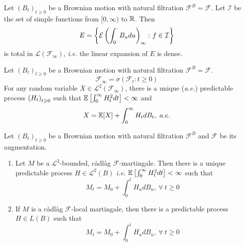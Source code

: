 \documentclass[a4paper,12pt]{article}
\begin{document}
\begin{itemize}
  \begin{thm}
    Let $(B_t)_{t \geqslant 0}$ be a Brownian motion with natural filtration $\mathcal{F}^B=\mathcal{F}$. Let $\mathcal{I}$ be the set of simple functions from $[0,\infty)$ to $\mathbb{R}$. Then
    \begin{equation*}
      E = \left\{\mathcal{E}\left(\int_0^{\cdot}B_udu\right)_{\infty} \colon f \in \mathcal{I}\right\}
    \end{equation*}
    is total in $\mathcal{L}(\mathcal{F}_{\infty})$, \emph{i.e.} the linear expansion of $E$ is dense.
  \end{thm}

  \begin{thm}
    Let $(B_t)_{t \geqslant 0}$ be a Brownian motion with natural filtration $\mathcal{F}^B=\mathcal{F}$. 
    \begin{equation*}
      \mathcal{F}_{\infty} = \sigma(\mathcal{F}_t \colon t \geqslant 0)
    \end{equation*}
    For any random variable $X \in \mathcal{L}^2(\mathcal{F}_{\infty})$, there is a unique (\emph{a.e.}) predictable process $\left(H_t\right)_{t \geqslant 0}$ such that $\mathbb{E}\left[\int_0^{\infty}H_t^2dt\right] < \infty$ and
    \begin{equation*}
      X = \mathbb{E}[X] + \int_0^{\infty} H_t dB_t,~a.e.
    \end{equation*}
  \end{thm}

  \begin{thm}
    Let $(B_t)_{t \geqslant 0}$ be a Brownian motion with natural filtration $\mathcal{F}^B$ and $\mathcal{F}$ be its augmentation.
    \begin{enumerate}[label=(\arabic*)]
      \item Let $M$ be a $\mathcal{L}^2$-bounded, c\`adl\`ag $\mathcal{F}$-martingale. Then there is a unique predictable process $H \in \mathcal{L}^2(B)$ \emph{i.e.} $\mathbb{E}\left[\int_0^{\infty}H_t^2dt\right] < \infty$ such that
      \begin{equation*}
        M_t = M_0 + \int_0^tH_udB_u,~\forall~t \geqslant 0
      \end{equation*}

      \item If $M$ is a c\`adl\`ag $\mathcal{F}$-local martingale, then there is a predictable process $H \in L(B)$ such that
      \begin{equation*}
        M_t = M_0 + \int_0^tH_udB_u,~\forall~t \geqslant 0
      \end{equation*}
    \end{enumerate}
  \end{thm}
\end{itemize}
\end{document}

